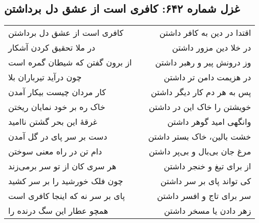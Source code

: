 \begin{center}
\section*{غزل شماره ۶۴۲: کافری است از عشق دل برداشتن}
\label{sec:642}
\begin{longtable}{l p{0.5cm} r}
کافری است از عشق دل برداشتن
&&
اقتدا در دین به کافر داشتن
\\
در ملا تحقیق کردن آشکار
&&
در خلا دین مزور داشتن
\\
از برون گفتن که شیطان گمره است
&&
وز درونش پیر و رهبر داشتن
\\
چون درآید تیرباران بلا
&&
در هزیمت دامن تر داشتن
\\
کار مردان چیست بیکار آمدن
&&
پس به هر دم کار دیگر داشتن
\\
خاک ره بر خود نمایان ریختن
&&
خویشتن را خاک این در داشتن
\\
غرقهٔ این بحر گشتن ناامید
&&
وانگهی امید گوهر داشتن
\\
دست بر سر پای در گل آمدن
&&
خشت بالین، خاک بستر داشتن
\\
دام تن در راه معنی سوختن
&&
مرغ جان بی‌بال و بی‌پر داشتن
\\
هر سری کان از تو سر برمی‌زند
&&
از برای تیغ و خنجر داشتن
\\
چون فلک خورشید را بر سر کشید
&&
کی تواند پای بر سر داشتن
\\
پای بر سر نه که اینجا کافری است
&&
سر برای تاج و افسر داشتن
\\
همچو عطار این سگ درنده را
&&
زهر دادن یا مسخر داشتن
\\
\end{longtable}
\end{center}
